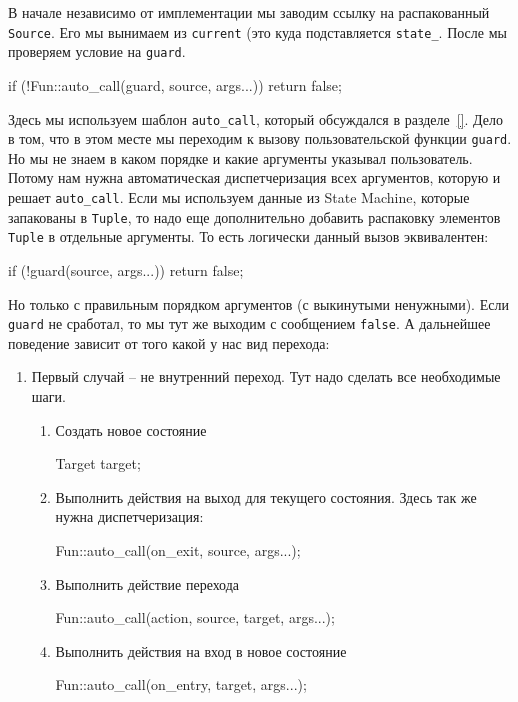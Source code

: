 \documentclass{article}
\begin{document}
{В начале независимо от имплементации мы заводим ссылку на распакованный \verb"Source".
Его мы вынимаем из \verb"current" (это куда подставляется \verb"state_".
После мы проверяем условие на \verb"guard".
\begin{cppcode}[\nonumbers]
if (!Fun::auto_call(guard, source, args...))
  return false;
\end{cppcode}
Здесь мы используем шаблон \verb"auto_call", который обсуждался в разделе~\ref{}.
Дело в том, что в этом месте мы переходим к вызову пользовательской функции \verb"guard".
Но мы не знаем в каком порядке и какие аргументы указывал пользователь.
Потому нам нужна автоматическая диспетчеризация всех аргументов, которую и решает \verb"auto_call".
Если мы используем данные из State Machine, которые запакованы в \verb"Tuple", то надо еще дополнительно добавить распаковку элементов \verb"Tuple" в отдельные аргументы.
То есть логически данный вызов эквивалентен:
\begin{cppcode}[\nonumbers]
if (!guard(source, args...))
  return false;
\end{cppcode}
Но только с правильным порядком аргументов (с выкинутыми ненужными).
Если \verb"guard" не сработал, то мы тут же выходим с сообщением \verb"false".
А дальнейшее поведение зависит от того какой у нас вид перехода:
\begin{enumerate}
\item Первый случай -- не внутренний переход.
Тут надо сделать все необходимые шаги.
\begin{enumerate}
\item Создать новое состояние
\begin{cppcode}[\nonumbers]
Target target;
\end{cppcode}

\item Выполнить действия на выход для текущего состояния.
Здесь так же нужна диспетчеризация:
\begin{cppcode}[\nonumbers]
Fun::auto_call(on_exit, source, args...);
\end{cppcode}

\item Выполнить действие перехода
\begin{cppcode}[\nonumbers]
Fun::auto_call(action, source, target, args...);
\end{cppcode}

\item Выполнить действия на вход в новое состояние
\begin{cppcode}[\nonumbers]
Fun::auto_call(on_entry, target, args...);
\end{cppcode}


\end{enumerate}
\end{enumerate}}
\end{document}
